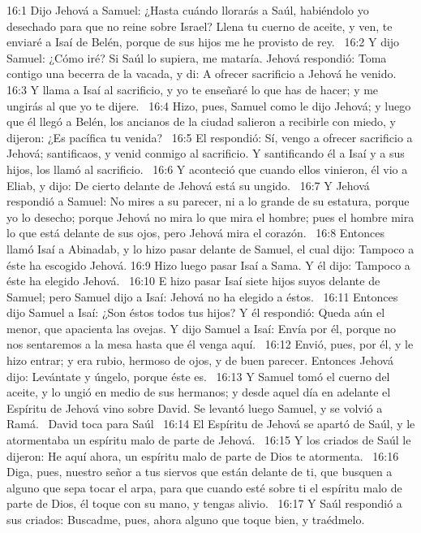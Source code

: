 16:1 Dijo Jehová a Samuel: ¿Hasta cuándo llorarás a Saúl, habiéndolo yo desechado para que no reine sobre Israel? Llena tu cuerno de aceite, y ven, te enviaré a Isaí de Belén, porque de sus hijos me he provisto de rey.  
16:2 Y dijo Samuel: ¿Cómo iré? Si Saúl lo supiera, me mataría. Jehová respondió: Toma contigo una becerra de la vacada, y di: A ofrecer sacrificio a Jehová he venido.  
16:3 Y llama a Isaí al sacrificio, y yo te enseñaré lo que has de hacer; y me ungirás al que yo te dijere.  
16:4 Hizo, pues, Samuel como le dijo Jehová; y luego que él llegó a Belén, los ancianos de la ciudad salieron a recibirle con miedo, y dijeron: ¿Es pacífica tu venida?  
16:5 El respondió: Sí, vengo a ofrecer sacrificio a Jehová; santificaos, y venid conmigo al sacrificio. Y santificando él a Isaí y a sus hijos, los llamó al sacrificio.  
16:6 Y aconteció que cuando ellos vinieron, él vio a Eliab, y dijo: De cierto delante de Jehová está su ungido.  
16:7 Y Jehová respondió a Samuel: No mires a su parecer, ni a lo grande de su estatura, porque yo lo desecho; porque Jehová no mira lo que mira el hombre; pues el hombre mira lo que está delante de sus ojos, pero Jehová mira el corazón.  
16:8 Entonces llamó Isaí a Abinadab, y lo hizo pasar delante de Samuel, el cual dijo: Tampoco a éste ha escogido Jehová. 
16:9 Hizo luego pasar Isaí a Sama. Y él dijo: Tampoco a éste ha elegido Jehová.  
16:10 E hizo pasar Isaí siete hijos suyos delante de Samuel; pero Samuel dijo a Isaí: Jehová no ha elegido a éstos.  
16:11 Entonces dijo Samuel a Isaí: ¿Son éstos todos tus hijos? Y él respondió: Queda aún el menor, que apacienta las ovejas. Y dijo Samuel a Isaí: Envía por él, porque no nos sentaremos a la mesa hasta que él venga aquí.  
16:12 Envió, pues, por él, y le hizo entrar; y era rubio, hermoso de ojos, y de buen parecer. Entonces Jehová dijo: Levántate y úngelo, porque éste es.  
16:13 Y Samuel tomó el cuerno del aceite, y lo ungió en medio de sus hermanos; y desde aquel día en adelante el Espíritu de Jehová vino sobre David. Se levantó luego Samuel, y se volvió a Ramá.  
David toca para Saúl  
16:14 El Espíritu de Jehová se apartó de Saúl, y le atormentaba un espíritu malo de parte de Jehová.  
16:15 Y los criados de Saúl le dijeron: He aquí ahora, un espíritu malo de parte de Dios te atormenta.  
16:16 Diga, pues, nuestro señor a tus siervos que están delante de ti, que busquen a alguno que sepa tocar el arpa, para que cuando esté sobre ti el espíritu malo de parte de Dios, él toque con su mano, y tengas alivio.  
16:17 Y Saúl respondió a sus criados: Buscadme, pues, ahora alguno que toque bien, y traédmelo.  

